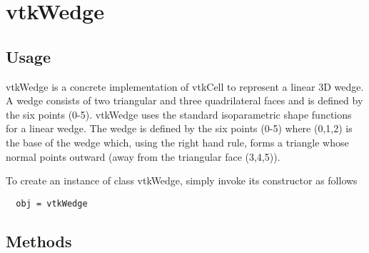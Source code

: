 \section{vtkWedge}

\subsection{Usage}

 vtkWedge is a concrete implementation of vtkCell to represent a linear 3D
 wedge. A wedge consists of two triangular and three quadrilateral faces
 and is defined by the six points (0-5). vtkWedge uses the standard
 isoparametric shape functions for a linear wedge. The wedge is defined
 by the six points (0-5) where (0,1,2) is the base of the wedge which,
 using the right hand rule, forms a triangle whose normal points outward
 (away from the triangular face (3,4,5)).

To create an instance of class vtkWedge, simply
invoke its constructor as follows
\begin{verbatim}
  obj = vtkWedge
\end{verbatim}
\subsection{Methods}

